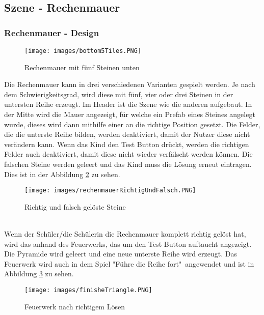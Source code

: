 \subsection{Szene - Rechenmauer}
\subsubsection{Rechenmauer - Design}
\begin{figure}[htbp]
  \centering
  \texttt{[image: images/bottom5Tiles.PNG]}
  \caption{Rechenmauer mit fünf Steinen unten}
  \label{triangle}
\end{figure}
Die Rechenmauer kann in drei verschiedenen Varianten gespielt werden. Je nach dem Schwierigkeitsgrad, wird diese mit fünf, vier oder drei Steinen in der untersten Reihe erzeugt. Im Header ist die Szene wie die anderen aufgebaut. In der Mitte wird die Mauer angezeigt, für welche ein Prefab eines Steines angelegt wurde, dieses wird dann mithilfe einer  an die richtige Position gesetzt. Die Felder, die die unterste Reihe bilden, werden deaktiviert, damit der Nutzer diese nicht verändern kann. Wenn das Kind den Test Button drückt, werden die richtigen Felder auch deaktiviert, damit diese nicht wieder verfälscht werden können. Die falschen Steine werden geleert und das Kind muss die Lösung erneut eintragen. Dies ist in der Abbildung \ref{wrongAndRightStone} zu sehen.\\
\begin{figure}[htbp]
  \centering
  \texttt{[image: images/rechenmauerRichtigUndFalsch.PNG]}
  \caption{Richtig und falsch gelöste Steine}
  \label{wrongAndRightStone}
\end{figure}\\
Wenn der Schüler/die Schülerin die Rechenmauer komplett richtig gelöst hat, wird das anhand des Feuerwerks, das um den Test Button auftaucht angezeigt. Die Pyramide wird geleert und eine neue unterste Reihe wird erzeugt. Das Feuerwerk wird auch in dem Spiel "Führe die Reihe fort"\ angewendet und ist in Abbildung \ref{firework} zu sehen.
\begin{figure}[htbp]
  \centering
  \texttt{[image: images/finisheTriangle.PNG]}
  \caption{Feuerwerk nach richtigem Lösen}
  \label{firework}
\end{figure}\\
